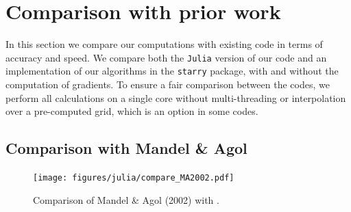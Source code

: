 \documentclass[modern]{aastex61}
\begin{document}
%
%
%
%

\section{Comparison with prior work} \label{sec:comparison}

In this section we compare our computations with existing code in terms
of accuracy and speed. We compare both the \texttt{Julia} version
of our code and an implementation of our algorithms
in the \texttt{starry} package, with and without the computation
of gradients. To ensure a fair comparison between the codes, we
perform all calculations on a single core without multi-threading
or interpolation over a pre-computed grid, which is an option
in some codes.

\subsection{Comparison with Mandel \& Agol}

\begin{figure}[t!]
    \begin{centering}
    \texttt{[image: figures/julia/compare\_MA2002.pdf]}
    \caption{Comparison of Mandel \& Agol (2002) with \thiswork.
    \label{fig:compareMA}}
    \end{centering}
\end{figure}
\end{document}
